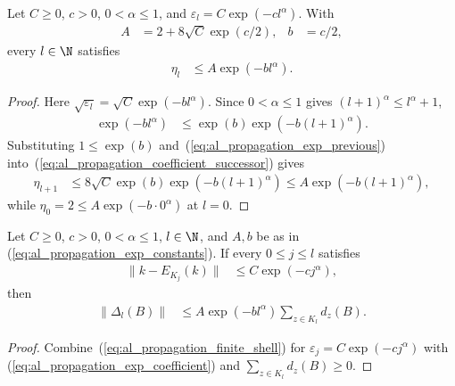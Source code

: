 \begin{lemma}
    \label{thm:al_channel_shell_coefficient_exp}
    \leanok
    Let $C\ge0$, $c>0$, $0<\alpha\le1$, and $\varepsilon_l=C\exp(-cl^\alpha)$.
    With
    \begin{align}
        A & =2+8\sqrt C\exp(c/2), & b & =c/2,
        \label{eq:al_propagation_exp_constants}
    \end{align}
    every $l\in\N$ satisfies
    \begin{align}
        \eta_l & \le A\exp(-bl^\alpha).
        \label{eq:al_propagation_exp_coefficient}
    \end{align}
\end{lemma}
\begin{proof}
    \leanok
    Here $\sqrt{\varepsilon_l}=\sqrt C\exp(-bl^\alpha)$. Since
    $0<\alpha\le1$ gives $(l+1)^\alpha\le l^\alpha+1$,
    \begin{align}
        \exp(-bl^\alpha)
         & \le\exp(b)\exp(-b(l+1)^\alpha).
        \label{eq:al_propagation_exp_previous}
    \end{align}
    Substituting $1\le\exp(b)$ and~(\ref{eq:al_propagation_exp_previous})
    into~(\ref{eq:al_propagation_coefficient_successor}) gives
    \begin{align}
        \eta_{l+1}
         & \le8\sqrt C\exp(b)\exp(-b(l+1)^\alpha)
        \le A\exp(-b(l+1)^\alpha),
        \label{eq:al_propagation_exp_successor}
    \end{align}
    while $\eta_0=2\le A\exp(-b\cdot0^\alpha)$ at $l=0$.
\end{proof}

\begin{lemma}
    \label{thm:al_channel_shell_exp_bound}
    \leanok
    Let $C\ge0$, $c>0$, $0<\alpha\le1$, $l\in\N$, and $A,b$ be as in
    (\ref{eq:al_propagation_exp_constants}). If every $0\le j\le l$ satisfies
    \begin{align}
        \|k-E_{K_j}(k)\| & \le C\exp(-cj^\alpha),
        \label{eq:al_propagation_exp_error}
    \end{align}
    then
    \begin{align}
        \|\Delta_l(B)\|
         & \le A\exp(-bl^\alpha)\sum_{z\in K_l}d_z(B).
        \label{eq:al_propagation_exp_shell}
    \end{align}
\end{lemma}
\begin{proof}
    \leanok
    Combine~(\ref{eq:al_propagation_finite_shell}) for
    $\varepsilon_j=C\exp(-cj^\alpha)$ with
    (\ref{eq:al_propagation_exp_coefficient}) and $\sum_{z\in K_l}d_z(B)\ge0$.
\end{proof}

